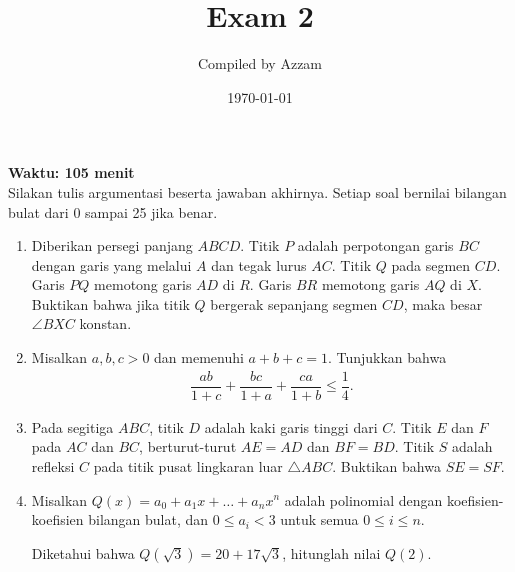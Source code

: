 \documentclass[11pt]{scrartcl}
\title{Exam 2}
\author{Compiled by Azzam}
\date{\today}
\begin{document}
\maketitle
\textbf{Waktu: 105 menit}\\
Silakan tulis argumentasi beserta jawaban akhirnya. Setiap soal bernilai bilangan bulat dari 0 sampai 25 jika benar.
\begin{enumerate}[resume]
\item Diberikan persegi panjang $ABCD$. Titik $P$ adalah perpotongan garis $BC$ dengan garis yang melalui $A$ dan tegak lurus $AC$. Titik $Q$ pada segmen $CD$. Garis $PQ$ memotong garis $AD$ di $R$. Garis $BR$ memotong garis $AQ$ di $X$. Buktikan bahwa jika titik $Q$ bergerak sepanjang segmen $CD$, maka besar $\angle BXC$ konstan.

\item Misalkan $a,b,c > 0$ dan memenuhi $a+b+c=1$. Tunjukkan bahwa
\begin{align*}
\dfrac{ab}{1+c}+\dfrac{bc}{1+a}+\dfrac{ca}{1+b} \le \dfrac{1}{4}.
\end{align*}

\item Pada segitiga $ABC$, titik $D$ adalah kaki garis tinggi dari $C$. Titik $E$ dan $F$ pada $AC$ dan $BC$, berturut-turut $AE = AD$ dan $BF = BD$. Titik $S$ adalah refleksi $C$ pada titik pusat lingkaran luar $\triangle ABC$. Buktikan bahwa $SE=SF$.

\item Misalkan $Q(x) = a_0 + a_1x + \dots + a_nx^n$ adalah polinomial dengan koefisien-koefisien bilangan bulat, dan $0 \le a_i < 3$ untuk semua $0 \le i \le n$.

Diketahui bahwa $Q(\sqrt{3}) = 20 + 17\sqrt{3}$, hitunglah nilai $Q(2)$.
\end{enumerate}
\end{document}
